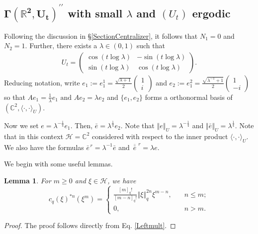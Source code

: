 \documentclass[12pt, a4paper,reqno]{amsart}
\newtheorem{Lemma}[Theorem]{Lemma}
\theoremstyle{definition}
\renewcommand{\leq}{\leqslant}
\renewcommand{\geq}{\geqslant}
\def\C{\mathbb C}
\def\R{\mathbb R}
\newcommand{\CH}{\mathcal{H}}
\newcommand{\norm}[1]{\left\Vert#1\right\Vert}
\begin{document}
\subsection{$\mathbf{\Gamma(\R^2, U_t )^{\prime\prime}}$ with small $\lambda$ and $(U_t)$ ergodic}\label{casebig2}

Following the discussion in \S\ref{SectionCentralizer}, it follows that $N_1=0$ and $N_2=1$. Further, there exists a $\lambda\in (0,1)$ such that 
\begin{align*}
U_t  = \left( \begin{matrix} \cos( t\log \lambda)& - \sin( t\log\lambda) \\
\sin( t\log\lambda)& \cos( t\log\lambda)  \end{matrix} \right).
\end{align*}
Reducing notation, write $e_1:=e_1^1=\frac{\sqrt{\lambda+1}}{2}\begin{pmatrix}1\\i\end{pmatrix}$ and $e_2:= e_1^2=\frac{\sqrt{\lambda^{-1}+1}}{2}\begin{pmatrix}1\\-i\end{pmatrix}$ so that $Ae_1 = \frac{1}{\lambda} e_1  \text{ and }  A e_2 = \lambda e_2$ and $\{ e_1, e_2\}$ forms a orthonormal basis of $(\C^2, \langle \cdot, \cdot \rangle_U)$.

Now we set $ e = \lambda^{-\frac{1}{4}}e_1$. Then, $\bar{e}= \lambda^{\frac{1}{4}}e_2$. Note that   $\norm{e}_U = \lambda^{-\frac{1}{4}}$ and  $\norm{\bar{e}}_U = \lambda^{\frac{1}{4}}$. Note that in this context $ \CH = \C^2$ considered with respect to the inner product $ \langle \cdot, \cdot \rangle_U$. We also have the formulas  $\bar{e}^{\,r}=\lambda^{-1} \bar e$ and $\overline{\,\bar{e}\,}^{\,r}=\lambda e$.


 
We begin with some useful lemmas. 
\begin{Lemma}\label{Adjpowers}
For $m\geq 0$ and $\xi\in \CH$, we have  
\begin{equation*}
c_q(\xi)^{*n}(\xi^m)=\begin{cases}\frac{[m]_q!}{[m-n]_q!} \norm{\xi}_q^{2n} \xi^{m-n}, \quad &n\leq m;\\
0, \quad  &n>m.\end{cases} 
\end{equation*} 
\end{Lemma}
\begin{proof}
The proof follows directly from Eq. \eqref{Leftmult}.
\end{proof}
\end{document}
